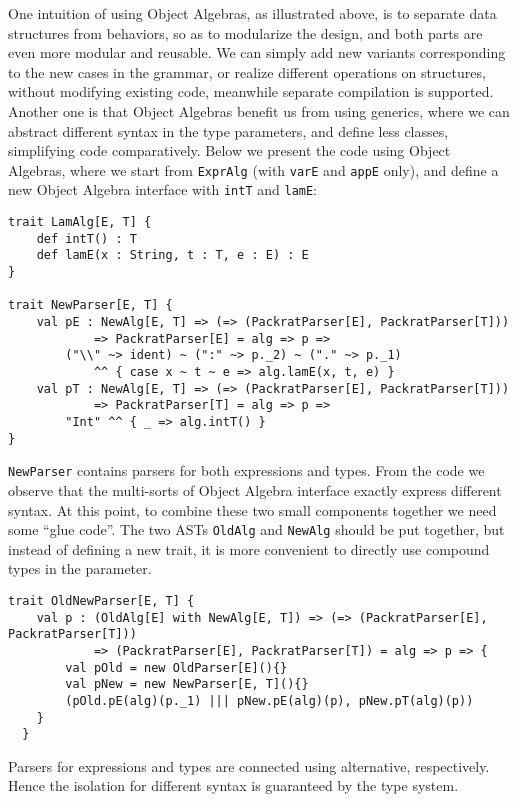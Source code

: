 One intuition of using Object Algebras, as illustrated above, is to separate data structures from behaviors, so as to modularize the design, and both parts are even more modular and reusable. We can simply add new variants corresponding to the new cases in the grammar, or realize different operations on structures, without modifying existing code, meanwhile separate compilation is supported. Another one is that Object Algebras benefit us from using generics, where we can abstract different syntax in the type parameters, and define less classes, simplifying code comparatively. Below we present the code using Object Algebras, where we start from \lstinline{ExprAlg} (with \lstinline{varE} and \lstinline{appE} only), and define a new Object Algebra interface with \lstinline{intT} and \lstinline{lamE}:
\begin{lstlisting}
trait LamAlg[E, T] {
    def intT() : T
    def lamE(x : String, t : T, e : E) : E
}

trait NewParser[E, T] {
    val pE : NewAlg[E, T] => (=> (PackratParser[E], PackratParser[T]))
            => PackratParser[E] = alg => p =>
        ("\\" ~> ident) ~ (":" ~> p._2) ~ ("." ~> p._1)
            ^^ { case x ~ t ~ e => alg.lamE(x, t, e) }
    val pT : NewAlg[E, T] => (=> (PackratParser[E], PackratParser[T]))
            => PackratParser[T] = alg => p =>
        "Int" ^^ { _ => alg.intT() }
}
\end{lstlisting}
\lstinline{NewParser} contains parsers for both expressions and types. From the code we observe that the multi-sorts of Object Algebra interface
exactly express different syntax. At this point, to combine these two small components together we need some ``glue code''. The two ASTs \lstinline{OldAlg} and
\lstinline{NewAlg} should be put together, but instead of defining a new trait, it is more convenient to directly use compound types in the parameter.
\begin{lstlisting}
trait OldNewParser[E, T] {
    val p : (OldAlg[E] with NewAlg[E, T]) => (=> (PackratParser[E], PackratParser[T]))
            => (PackratParser[E], PackratParser[T]) = alg => p => {
        val pOld = new OldParser[E](){}
        val pNew = new NewParser[E, T](){}
        (pOld.pE(alg)(p._1) ||| pNew.pE(alg)(p), pNew.pT(alg)(p))
    }
  }
\end{lstlisting}
Parsers for expressions and types are connected using alternative, respectively. Hence the isolation for different syntax
is guaranteed by the type system.
